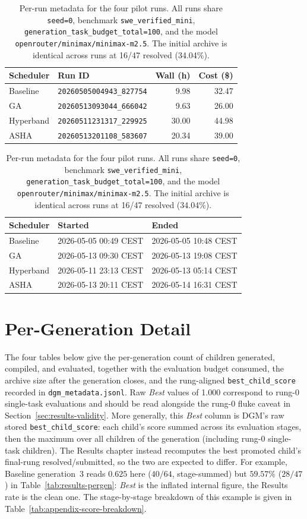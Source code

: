 \begin{table}[ht]
\centering
\caption{Per-run metadata for the four pilot runs. All runs share
\texttt{seed=0}, benchmark \texttt{swe\_verified\_mini},
\texttt{generation\_task\_budget\_total=100}, and the model
\texttt{openrouter/minimax/minimax-m2.5}. The initial archive is
identical across runs at 16/47 resolved (34.04\%).}
\label{tab:appendix-run-metadata}
\begin{tabular}{llrr}
\hline
Scheduler & Run ID & Wall (h) & Cost (\$) \\
\hline
Baseline  & \texttt{20260505004943\_827754} &  9.98 & 32.47 \\
GA        & \texttt{20260513093044\_666042} &  9.63 & 26.00 \\
Hyperband & \texttt{20260511231317\_229925} & 30.00 & 44.98 \\
ASHA      & \texttt{20260513201108\_583607} & 20.34 & 39.00 \\
\hline
\end{tabular}

\vspace{1ex}

\begin{tabular}{lll}
\hline
Scheduler & Started & Ended \\
\hline
Baseline  & 2026-05-05 00:49 CEST & 2026-05-05 10:48 CEST \\
GA        & 2026-05-13 09:30 CEST & 2026-05-13 19:08 CEST \\
Hyperband & 2026-05-11 23:13 CEST & 2026-05-13 05:14 CEST \\
ASHA      & 2026-05-13 20:11 CEST & 2026-05-14 16:31 CEST \\
\hline
\end{tabular}
\end{table}

\section{Per-Generation Detail}
\label{app:per-gen-detail}

The four tables below give the per-generation count of children
generated, compiled, and evaluated, together with the evaluation
budget consumed, the archive size after the generation closes, and the
rung-aligned \texttt{best\_child\_score} recorded in
\texttt{dgm\_metadata.jsonl}. Raw \emph{Best} values of 1.000
correspond to rung-0 single-task evaluations and should be read
alongside the rung-0 fluke caveat in
Section~\ref{sec:results-validity}. More generally, this \emph{Best}
column is DGM's raw stored \texttt{best\_child\_score}: each child's
score summed across its evaluation stages, then the maximum over all
children of the generation (including rung-0 single-task children). The
Results chapter instead recomputes the best promoted child's final-rung
resolved/submitted, so the two are expected to differ. For example,
Baseline generation~3 reads $0.625$ here ($40/64$, stage-summed) but
$59.57\%$ ($28/47$) in Table~\ref{tab:results-pergen}: \emph{Best} is
the inflated internal figure, the Results rate is the clean one. The
stage-by-stage breakdown of this example is given in
Table~\ref{tab:appendix-score-breakdown}.

